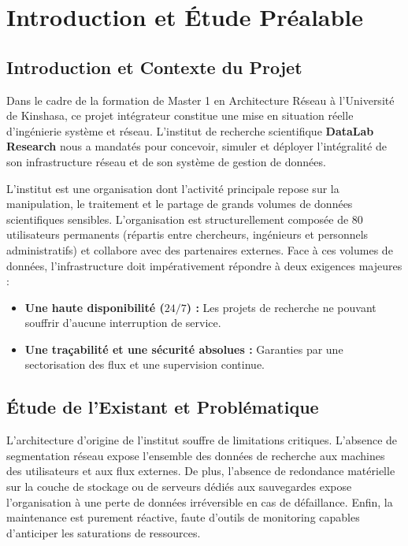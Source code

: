 \chapter{Introduction et Étude Préalable}
\label{chap:introduction}

\section{Introduction et Contexte du Projet}
Dans le cadre de la formation de Master 1 en Architecture Réseau à l'Université de Kinshasa, ce projet intégrateur constitue une mise en situation réelle d'ingénierie système et réseau. L'institut de recherche scientifique \textbf{DataLab Research} nous a mandatés pour concevoir, simuler et déployer l'intégralité de son infrastructure réseau et de son système de gestion de données. 

L'institut est une organisation dont l'activité principale repose sur la manipulation, le traitement et le partage de grands volumes de données scientifiques sensibles. L'organisation est structurellement composée de 80 utilisateurs permanents (répartis entre chercheurs, ingénieurs et personnels administratifs) et collabore avec des partenaires externes. Face à ces volumes de données, l'infrastructure doit impérativement répondre à deux exigences majeures :
\begin{itemize}
    \item \textbf{Une haute disponibilité ($24/7$) :} Les projets de recherche ne pouvant souffrir d'aucune interruption de service.
    \item \textbf{Une traçabilité et une sécurité absolues :} Garanties par une sectorisation des flux et une supervision continue.
\end{itemize}

\section{Étude de l'Existant et Problématique}
L'architecture d'origine de l'institut souffre de limitations critiques. L'absence de segmentation réseau expose l'ensemble des données de recherche aux machines des utilisateurs et aux flux externes. De plus, l'absence de redondance matérielle sur la couche de stockage ou de serveurs dédiés aux sauvegardes expose l'organisation à une perte de données irréversible en cas de défaillance. Enfin, la maintenance est purement réactive, faute d'outils de monitoring capables d'anticiper les saturations de ressources.

